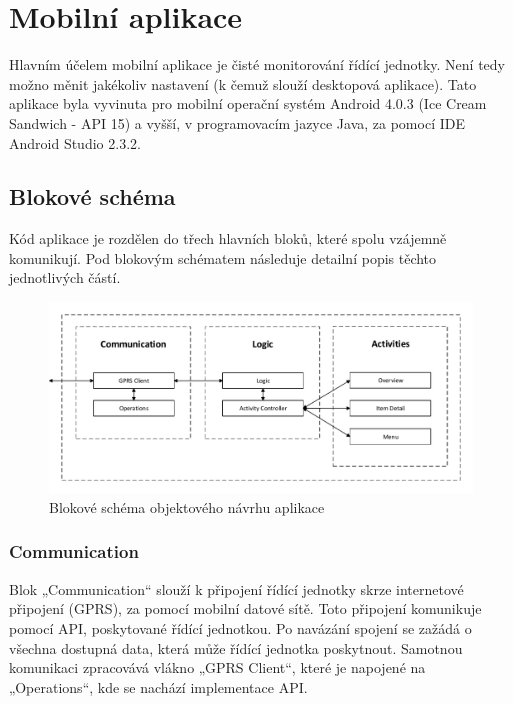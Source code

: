 \documentclass[FM,DP]{tulthesis}  %
\begin{document}

\chapter{Mobilní aplikace}
Hlavním účelem mobilní aplikace je čisté monitorování řídící jednotky. Není tedy možno měnit jakékoliv nastavení (k čemuž slouží desktopová aplikace). Tato aplikace byla vyvinuta pro mobilní operační systém Android 4.0.3 (Ice Cream Sandwich - API 15) a vyšší, v programovacím jazyce Java, za pomocí IDE Android Studio 2.3.2.

\section{Blokové schéma}
Kód aplikace je rozdělen do třech hlavních bloků, které spolu vzájemně komunikují. Pod blokovým schématem následuje detailní popis těchto jednotlivých částí.

\begin{figure}[H]
\begin{center}
\includegraphics[width=\textwidth]{vector/blokoveSchemaSecurityViewer.pdf}
\caption{Blokové schéma objektového návrhu aplikace}
\label{image}
\end{center}
\end{figure}

\subsection{Communication}
Blok „Communication“ slouží k připojení řídící jednotky skrze internetové připojení (GPRS), za pomocí mobilní datové sítě. Toto připojení komunikuje pomocí API, poskytované řídící jednotkou. Po navázání spojení se zažádá o všechna dostupná data, která může řídící jednotka poskytnout. Samotnou komunikaci zpracovává vlákno „GPRS Client“, které je napojené na „Operations“, kde se nachází implementace API.
\end{document}

